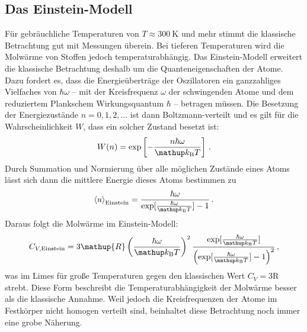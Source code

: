 \subsection{Das Einstein-Modell}
\label{subsec:einstein}
Für gebräuchliche Temperaturen von $T \approx \SI{300}{\kelvin}$ und mehr
stimmt die klassische Betrachtung gut mit Messungen überein.
Bei tieferen Temperaturen wird die Molwärme von Stoffen jedoch
temperaturabhängig.
Das Einstein-Modell erweitert die klassische Betrachtung deshalb um die
Quanteneigenschaften der Atome. Dazu fordert es, dass die Energieüberträge
der Oszillatoren ein ganzzahliges Vielfaches von $\hbar\omega$ -- mit
der Kreisfrequenz $\omega$ der schwingenden Atome und dem reduziertem Plankschem Wirkungsquantum $\hbar$ -- betragen müssen.
Die Besetzung der Energiezustände $n = 0,1,2,\dots$ ist dann Boltzmann-verteilt
und es gilt für die Wahrscheinlichkeit $W$, dass ein solcher Zustand besetzt
ist:
\begin{equation}
    \label{eqn:boltzmann}
    W(n) = \exp\left[-\frac{n\hbar\omega}{\kb T}\right]\,.
\end{equation}
Durch Summation und Normierung über alle möglichen Zustände eines Atoms
lässt sich dann die mittlere Energie dieses Atoms bestimmen zu
\begin{equation}
    \label{eqn:u_einstein}
    \left<u\right>_\text{Einstein} =
    \frac{\hbar\omega}{\exp[\frac{\hbar\omega}{\kb T}] - 1}\,.
\end{equation}
Daraus folgt die Molwärme im Einstein-Modell:
\begin{equation}
    \label{eqn:cv_einstein}
    C_{V,\text{Einstein}} =
    3\mathup{R}\left(\frac{\hbar\omega}{\kb T}\right)^2
    \frac{
        \exp[\frac{\hbar\omega}{\kb T}]
    }{
        \left(\exp[\frac{\hbar\omega}{\kb T}] - 1\right)^2
    }\,,
\end{equation}
was im Limes für große Temperaturen gegen den klassischen Wert
$C_V = 3\mathup{R}$ strebt.
Diese Form beschreibt die Temperaturabhängigkeit der Molwärme besser als
die klassische Annahme. Weil jedoch die Kreisfrequenzen der Atome im Festkörper
nicht homogen verteilt sind, beinhaltet diese Betrachtung noch immer eine grobe
Näherung.


